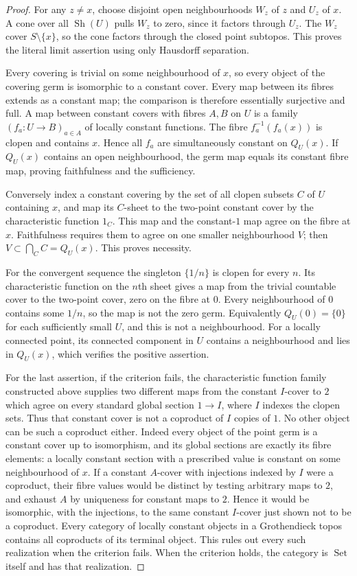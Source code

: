 \begin{proof}
For any $z\ne x$, choose disjoint open neighbourhoods $W_z$ of
$z$ and $U_z$ of $x$. A cone over all $\operatorname{Sh}(U)$
pulls $W_z$ to zero, since it factors through $U_z$. The $W_z$
cover $S\setminus\{x\}$, so the cone factors through the
closed point subtopos. This proves the literal limit assertion
using only Hausdorff separation.

Every covering is trivial on some neighbourhood of $x$, so every
object of the covering germ is isomorphic to a constant cover.
Every map between its fibres extends as a constant map; the
comparison is therefore essentially surjective and full.
A map between constant covers with fibres $A,B$ on $U$ is a
family $(f_a:U\to B)_{a\in A}$ of locally constant functions.
The fibre $f_a^{-1}(f_a(x))$ is clopen and contains $x$.
Hence all $f_a$ are simultaneously constant on $Q_U(x)$. If
$Q_U(x)$ contains an open neighbourhood, the germ map equals
its constant fibre map, proving faithfulness and the sufficiency.

Conversely index a constant covering by the set of all clopen
subsets $C$ of $U$ containing $x$, and map its $C$-sheet to the
two-point constant cover by the characteristic function $1_C$.
This map and the constant-$1$ map agree on the fibre at $x$.
Faithfulness requires them to agree on one smaller neighbourhood
$V$; then $V\subset\bigcap_C C=Q_U(x)$. This proves necessity.

For the convergent sequence the singleton $\{1/n\}$ is clopen
for every $n$. Its characteristic function on the $n$th sheet
gives a map from the trivial countable cover to the two-point
cover, zero on the fibre at $0$. Every neighbourhood of $0$
contains some $1/n$, so the map is not the zero germ. Equivalently
$Q_U(0)=\{0\}$ for each sufficiently small $U$, and this is
not a neighbourhood. For a locally connected point, its connected
component in $U$ contains a neighbourhood and lies in $Q_U(x)$,
which verifies the positive assertion.

For the last assertion, if the criterion fails, the characteristic
function family constructed above supplies two different maps from
the constant $I$-cover to $2$ which agree on every standard global
section $1\to I$, where $I$ indexes the clopen sets. Thus that
constant cover is not a coproduct of $I$ copies of $1$. No other
object can be such a coproduct either. Indeed every object of the
point germ is a constant cover up to isomorphism, and its global
sections are exactly its fibre elements: a locally constant section
with a prescribed value is constant on some neighbourhood of $x$.
If a constant $A$-cover with injections indexed by $I$ were a
coproduct, their fibre values would be distinct by testing arbitrary
maps to $2$, and exhaust $A$ by uniqueness for constant maps to $2$.
Hence it would be isomorphic, with the injections, to the same
constant $I$-cover just shown not to be a coproduct. Every category
of locally constant objects in a Grothendieck topos contains all
coproducts of its terminal object. This rules out every such
realization when the criterion fails. When the criterion holds,
the category is $\operatorname{Set}$ itself and has that
realization.
\end{proof}

